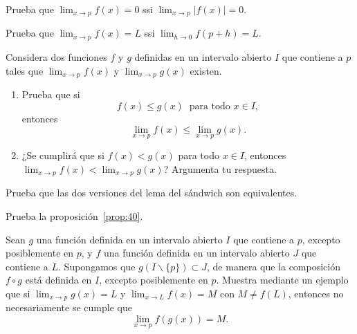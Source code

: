 \documentclass[12pt,a4paper]{book}
\begin{document}
    \begin{ejercicio}\label{ej:146}
        Prueba que $\lim_{x\to p}f(x)=0$ ssi $\lim_{x\to p}|f(x)|=0$.
    \end{ejercicio}

    \begin{ejercicio}\label{ej:147}
        Prueba que $\lim_{x\to p}f(x)=L$ ssi $\lim_{h\to 0}f(p+h)=L$.
    \end{ejercicio}

    \begin{ejercicio}\label{ej:148}
        Considera dos funciones $f$ y $g$
        definidas en un intervalo abierto $I$ que contiene a $p$ tales que $\lim_{x\to p}f(x)$ y
        $\lim_{x\to p}g(x)$ existen.
        \begin{enumerate}
            \item Prueba que si
            \begin{equation*}
                f(x)\leq g(x)\ \text{ para todo }x\in I,
            \end{equation*}
            entonces
            \begin{equation*}
                \lim_{x\to p}f(x)\leq\lim_{x\to p}g(x).
            \end{equation*}
            \item ¿Se cumplirá que si $f(x)<g(x)$ para todo $x\in I$, entonces $\lim_{x\to p}f(x)<
            \lim_{x\to p}g(x)$? Argumenta tu respuesta.
        \end{enumerate}
    \end{ejercicio}

    \begin{ejercicio}\label{ej:149}
        Prueba que las dos versiones del lema del sándwich son
        equivalentes.
    \end{ejercicio}

    \begin{ejercicio}\label{ej:150}
        Prueba la proposición~\ref{prop:40}.
    \end{ejercicio}

    \begin{ejercicio}\label{ej:151}
        Sean $g$ una función definida en un intervalo abierto $I$ que
        contiene a $p$, excepto posiblemente en $p$, y $f$ una función definida en un
        intervalo abierto $J$ que contiene a $L$. Supongamos que $g(I\backslash\{p\})\subset J$, de
        manera que la composición $f\circ g$ está definida en $I$, excepto posiblemente en
        $p$. Muestra mediante un ejemplo que si $\lim_{x\to p}g(x)=L$ y $\lim_{x\to L}f(x)=M$
        con $M\neq f(L)$, entonces no necesariamente se cumple que
        \begin{equation*}
            \lim_{x\to p}f(g(x))=M.
        \end{equation*}
    \end{ejercicio}
\end{document}

